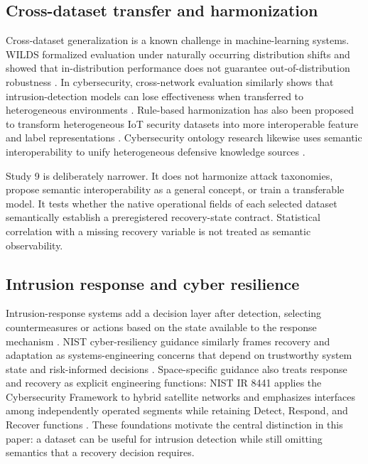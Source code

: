 \documentclass[preprint,12pt]{elsarticle}
\begin{document}
\subsection{Cross-dataset transfer and harmonization}

Cross-dataset generalization is a known challenge in machine-learning systems. WILDS formalized evaluation under naturally occurring distribution shifts and showed that in-distribution performance does not guarantee out-of-distribution robustness \cite{koh2021wilds}. In cybersecurity, cross-network evaluation similarly shows that intrusion-detection models can lose effectiveness when transferred to heterogeneous environments \cite{cerasuolo2026transfer}. Rule-based harmonization has also been proposed to transform heterogeneous IoT security datasets into more interoperable feature and label representations \cite{rodriguez2026harmonization}. Cybersecurity ontology research likewise uses semantic interoperability to unify heterogeneous defensive knowledge sources \cite{akbar2023ontology}.

Study 9 is deliberately narrower. It does not harmonize attack taxonomies, propose semantic interoperability as a general concept, or train a transferable model. It tests whether the native operational fields of each selected dataset semantically establish a preregistered recovery-state contract. Statistical correlation with a missing recovery variable is not treated as semantic observability.

\subsection{Intrusion response and cyber resilience}

Intrusion-response systems add a decision layer after detection, selecting countermeasures or actions based on the state available to the response mechanism \cite{bashendy2023irs}. NIST cyber-resiliency guidance similarly frames recovery and adaptation as systems-engineering concerns that depend on trustworthy system state and risk-informed decisions \cite{ross2021cyberresilient}. Space-specific guidance also treats response and recovery as explicit engineering functions: NIST IR 8441 applies the Cybersecurity Framework to hybrid satellite networks and emphasizes interfaces among independently operated segments while retaining Detect, Respond, and Recover functions \cite{mccarthy2023hsn}. These foundations motivate the central distinction in this paper: a dataset can be useful for intrusion detection while still omitting semantics that a recovery decision requires.
\end{document}
